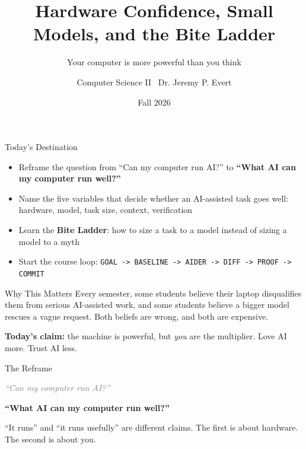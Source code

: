 \documentclass[aspectratio=169]{beamer}
\title{Hardware Confidence, Small Models, and the Bite Ladder}
\subtitle{Your computer is more powerful than you think}
\author{Computer Science II \textbullet\ Dr. Jeremy P. Evert}
\date{Fall 2026}
\begin{document}
\begin{frame}[plain]\titlepage\end{frame}

\begin{destinationframe}{Today's Destination}
  \begin{itemize}
    \item Reframe the question from ``Can my computer run AI?'' to \textbf{``What AI can my computer run well?''}
    \item Name the five variables that decide whether an AI-assisted task goes well: hardware, model, task size, context, verification
    \item Learn the \textbf{Bite Ladder}: how to size a task to a model instead of sizing a model to a myth
    \item Start the course loop: \texttt{GOAL -> BASELINE -> AIDER -> DIFF -> PROOF -> COMMIT}
  \end{itemize}
\end{destinationframe}

\begin{whymattersframe}{Why This Matters}
  Every semester, some students believe their laptop disqualifies them
  from serious AI-assisted work, and some students believe a bigger
  model rescues a vague request. Both beliefs are wrong, and both are
  expensive.

  \vspace{3mm}
  \textbf{Today's claim:} the machine is powerful, but \emph{you} are
  the multiplier. Love AI more. Trust AI less.
\end{whymattersframe}

\begin{conceptframe}{The Reframe}
  \begin{center}
    \Large \textcolor{gray}{\textit{``Can my computer run AI?''}}

    \vspace{4mm}
    \Large\color{cs2primary}\textbf{``What AI can my computer run well?''}
  \end{center}

  \vspace{3mm}
  ``It runs'' and ``it runs usefully'' are different claims. The first
  is about hardware. The second is about you.
\end{conceptframe}
\end{document}
